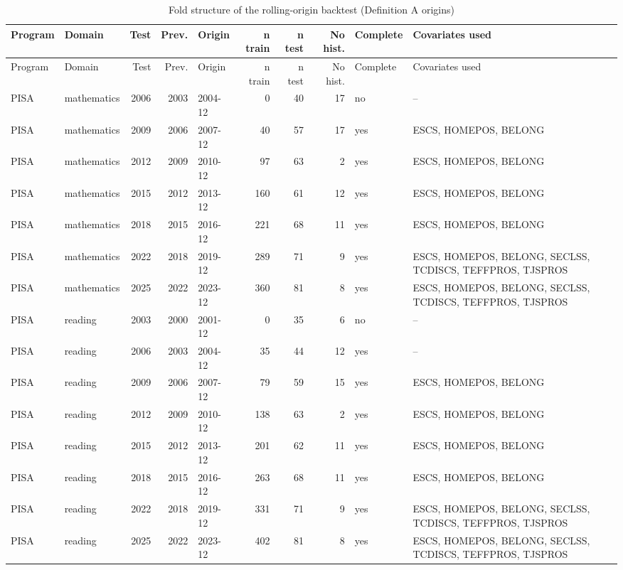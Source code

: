 {\scriptsize
\begin{longtable}{llrrlrrrlp{4.2cm}}
\caption{Fold structure of the rolling-origin backtest (Definition A origins)}\label{tab:A20}\\
\toprule
Program & Domain & Test & Prev. & Origin & n train & n test & No hist. & Complete & Covariates used \\
\midrule
\endfirsthead
\toprule
Program & Domain & Test & Prev. & Origin & n train & n test & No hist. & Complete & Covariates used \\
\midrule
\endhead
\bottomrule
\endlastfoot
PISA & mathematics & 2006 & 2003 & 2004-12 & 0 & 40 & 17 & no & -- \\
PISA & mathematics & 2009 & 2006 & 2007-12 & 40 & 57 & 17 & yes & ESCS, HOMEPOS, BELONG \\
PISA & mathematics & 2012 & 2009 & 2010-12 & 97 & 63 & 2 & yes & ESCS, HOMEPOS, BELONG \\
PISA & mathematics & 2015 & 2012 & 2013-12 & 160 & 61 & 12 & yes & ESCS, HOMEPOS, BELONG \\
PISA & mathematics & 2018 & 2015 & 2016-12 & 221 & 68 & 11 & yes & ESCS, HOMEPOS, BELONG \\
PISA & mathematics & 2022 & 2018 & 2019-12 & 289 & 71 & 9 & yes & ESCS, HOMEPOS, BELONG, SECLSS, TCDISCS, TEFFPROS, TJSPROS \\
PISA & mathematics & 2025 & 2022 & 2023-12 & 360 & 81 & 8 & yes & ESCS, HOMEPOS, BELONG, SECLSS, TCDISCS, TEFFPROS, TJSPROS \\
PISA & reading & 2003 & 2000 & 2001-12 & 0 & 35 & 6 & no & -- \\
PISA & reading & 2006 & 2003 & 2004-12 & 35 & 44 & 12 & yes & -- \\
PISA & reading & 2009 & 2006 & 2007-12 & 79 & 59 & 15 & yes & ESCS, HOMEPOS, BELONG \\
PISA & reading & 2012 & 2009 & 2010-12 & 138 & 63 & 2 & yes & ESCS, HOMEPOS, BELONG \\
PISA & reading & 2015 & 2012 & 2013-12 & 201 & 62 & 11 & yes & ESCS, HOMEPOS, BELONG \\
PISA & reading & 2018 & 2015 & 2016-12 & 263 & 68 & 11 & yes & ESCS, HOMEPOS, BELONG \\
PISA & reading & 2022 & 2018 & 2019-12 & 331 & 71 & 9 & yes & ESCS, HOMEPOS, BELONG, SECLSS, TCDISCS, TEFFPROS, TJSPROS \\
PISA & reading & 2025 & 2022 & 2023-12 & 402 & 81 & 8 & yes & ESCS, HOMEPOS, BELONG, SECLSS, TCDISCS, TEFFPROS, TJSPROS \\

\end{longtable}}
